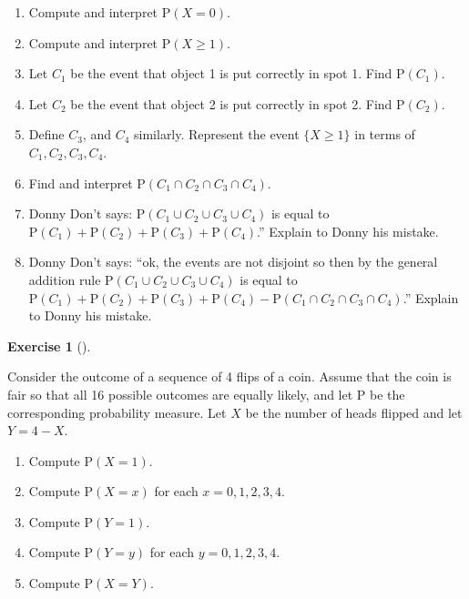 \documentclass[
  letterpaper,
  DIV=11,
  numbers=noendperiod]{scrreprt}
\providecommand{\tightlist}{%
  \setlength{\itemsep}{0pt}\setlength{\parskip}{0pt}}
\theoremstyle{plain}
\theoremstyle{definition}
\theoremstyle{definition}
\newtheorem{exercise}{Exercise}[chapter]
\theoremstyle{definition}
\theoremstyle{remark}
\begin{document}
\begin{enumerate}
\def\labelenumi{\arabic{enumi}.}
\tightlist
\item
  Compute and interpret \(\textrm{P}(X=0)\).
\item
  Compute and interpret \(\textrm{P}(X \ge 1)\).
\item
  Let \(C_1\) be the event that object 1 is put correctly in spot 1.
  Find \(\textrm{P}(C_1)\).
\item
  Let \(C_2\) be the event that object 2 is put correctly in spot 2.
  Find \(\textrm{P}(C_2)\).
\item
  Define \(C_3\), and \(C_4\) similarly. Represent the event
  \(\{X \ge 1\}\) in terms of \(C_1, C_2, C_3, C_4\).
\item
  Find and interpret \(\textrm{P}(C_1\cap C_2 \cap C_3 \cap C_4)\).
\item
  Donny Don't says: \(\textrm{P}(C_1 \cup C_2 \cup C_3 \cup C_4)\) is
  equal to
  \(\textrm{P}(C_1)+\textrm{P}(C_2)+\textrm{P}(C_3)+\textrm{P}(C_4)\).''
  Explain to Donny his mistake.
\item
  Donny Don't says: ``ok, the events are not disjoint so then by the
  general addition rule \(\textrm{P}(C_1 \cup C_2 \cup C_3 \cup C_4)\)
  is equal to
  \(\textrm{P}(C_1)+\textrm{P}(C_2)+\textrm{P}(C_3)+\textrm{P}(C_4)-\textrm{P}(C_1\cap C_2 \cap C_3 \cap C_4)\).''
  Explain to Donny his mistake.
\end{enumerate}

\begin{exercise}[]\protect\hypertarget{exr-probspace-coin4}{}\label{exr-probspace-coin4}

Consider the outcome of a sequence of 4 flips of a coin. Assume that the
coin is fair so that all 16 possible outcomes are equally likely, and
let \(\textrm{P}\) be the corresponding probability measure. Let \(X\)
be the number of heads flipped and let \(Y=4-X\).

\begin{enumerate}
\def\labelenumi{\arabic{enumi}.}
\tightlist
\item
  Compute \(\textrm{P}(X=1)\).
\item
  Compute \(\textrm{P}(X = x)\) for each \(x = 0, 1, 2, 3, 4\).
\item
  Compute \(\textrm{P}(Y=1)\).
\item
  Compute \(\textrm{P}(Y = y)\) for each \(y = 0, 1, 2, 3, 4\).
\item
  Compute \(\textrm{P}(X = Y)\).
\end{enumerate}

\end{exercise}
\end{document}
